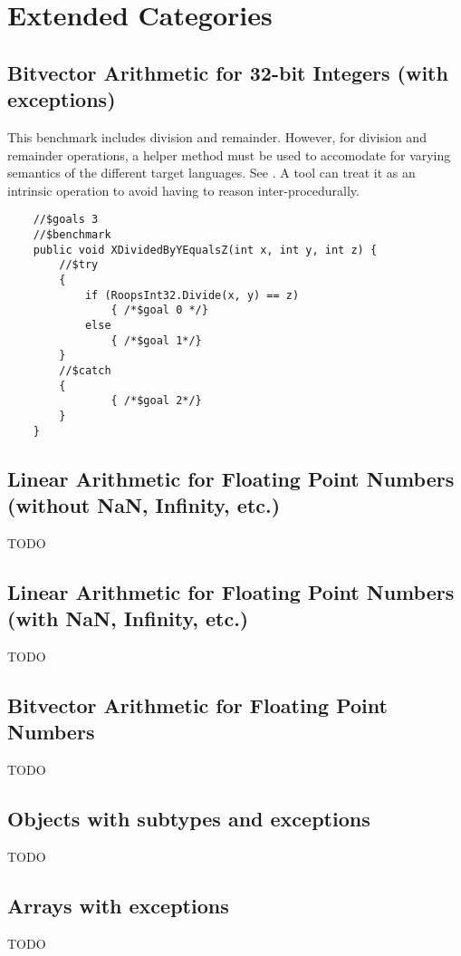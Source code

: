 \section{Extended Categories}

\subsection{Bitvector Arithmetic for 32-bit Integers (with exceptions)}

This benchmark includes division and remainder.
However, for division and remainder operations, a helper method must be used 
to accomodate for varying semantics of the different target languages.
See . A tool can treat it as an intrinsic operation
to avoid having to reason inter-procedurally.

\begin{verbatim}
    //$goals 3
    //$benchmark
    public void XDividedByYEqualsZ(int x, int y, int z) {
        //$try
        {
            if (RoopsInt32.Divide(x, y) == z)
                { /*$goal 0 */}
            else
                { /*$goal 1*/}
        }
        //$catch
        {
                { /*$goal 2*/}
        }
    }
\end{verbatim}

\subsection{Linear Arithmetic for Floating Point Numbers (without NaN, Infinity, etc.)}
TODO
\subsection{Linear Arithmetic for Floating Point Numbers (with NaN, Infinity, etc.)}
TODO
\subsection{Bitvector Arithmetic for Floating Point Numbers}
TODO

\subsection{Objects with subtypes and exceptions}
TODO

\subsection{Arrays with exceptions}
TODO
